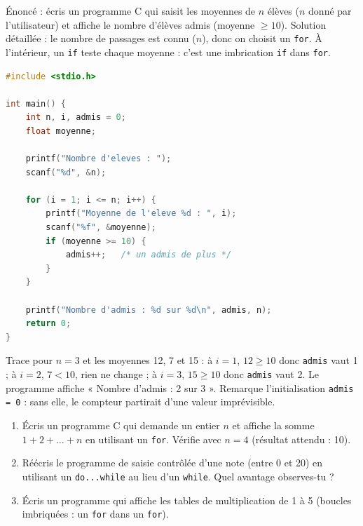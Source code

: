 \documentclass[11pt]{article}
\begin{document}
\begin{exoresolu}
Énoncé : écris un programme C qui saisit les moyennes de $n$ élèves ($n$ donné par l'utilisateur) et affiche le nombre d'élèves admis (moyenne $\geq 10$).
\tcblower
Solution détaillée : le nombre de passages est connu ($n$), donc on choisit un \texttt{for}. À l'intérieur, un \texttt{if} teste chaque moyenne : c'est une imbrication \texttt{if} dans \texttt{for}.
\begin{lstlisting}[language=C]
#include <stdio.h>

int main() {
    int n, i, admis = 0;
    float moyenne;

    printf("Nombre d'eleves : ");
    scanf("%d", &n);

    for (i = 1; i <= n; i++) {
        printf("Moyenne de l'eleve %d : ", i);
        scanf("%f", &moyenne);
        if (moyenne >= 10) {
            admis++;   /* un admis de plus */
        }
    }

    printf("Nombre d'admis : %d sur %d\n", admis, n);
    return 0;
}
\end{lstlisting}
Trace pour $n = 3$ et les moyennes 12, 7 et 15 : à $i = 1$, $12 \geq 10$ donc \texttt{admis} vaut 1 ; à $i = 2$, $7 < 10$, rien ne change ; à $i = 3$, $15 \geq 10$ donc \texttt{admis} vaut 2. Le programme affiche « Nombre d'admis : 2 sur 3 ». Remarque l'initialisation \texttt{admis = 0} : sans elle, le compteur partirait d'une valeur imprévisible.
\end{exoresolu}

\begin{exercice}
\begin{enumerate}
\item Écris un programme C qui demande un entier $n$ et affiche la somme $1 + 2 + \dots + n$ en utilisant un \texttt{for}. Vérifie avec $n = 4$ (résultat attendu : 10).
\item Réécris le programme de saisie contrôlée d'une note (entre 0 et 20) en utilisant un \texttt{do...while} au lieu d'un \texttt{while}. Quel avantage observes-tu ?
\item Écris un programme qui affiche les tables de multiplication de 1 à 5 (boucles imbriquées : un \texttt{for} dans un \texttt{for}).
\end{enumerate}
\end{exercice}
\end{document}
